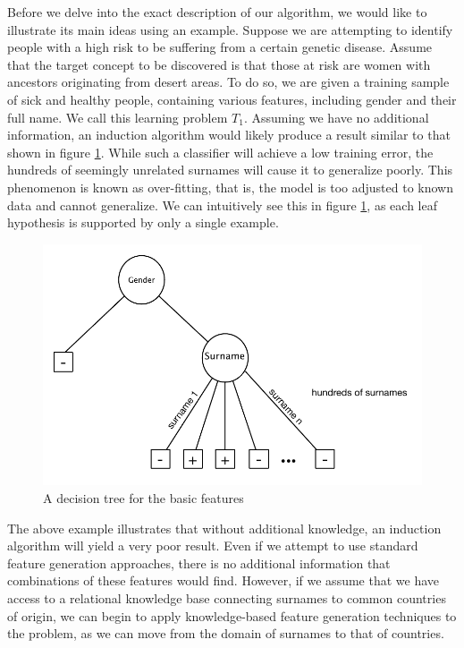 \documentclass[twoside,11pt]{article}
\theoremstyle{definition}
\begin{document}
Before we delve into the exact description of our algorithm, we would like to illustrate its main ideas using an example.
Suppose we are attempting to identify people with a high risk to be suffering from a certain genetic disease. Assume that the target concept to be discovered is that those at risk are women with ancestors originating from desert areas. To do so, we are given a training sample of sick and healthy people, containing various features, including gender and their full name. We call this learning problem $T_1$.
Assuming we have no additional information, an induction algorithm would likely produce a result similar to that shown in figure \ref{fig:tree_base}. While such a classifier will achieve a low training error, the hundreds of seemingly unrelated surnames will cause it to generalize poorly. This phenomenon is known as over-fitting, that is, the model is too adjusted to known data and cannot generalize. We can intuitively see this in figure \ref{fig:tree_base}, as each leaf hypothesis is supported by only a single example.

\begin{figure}
	\centering
	\includegraphics[width=\linewidth]{fig1.pdf}
	\caption{A decision tree for the basic features}
	\label{fig:tree_base}
\end{figure}

The above example illustrates that without additional knowledge, an induction algorithm will yield a very poor result. Even if we attempt to use standard feature generation approaches, there is no additional information that combinations of these features would find.
However, if we assume that we have access to a relational knowledge base connecting surnames to common countries of origin, we can begin to apply knowledge-based feature generation techniques to the problem, as we can move from the domain of surnames to that of countries. 
\end{document}
